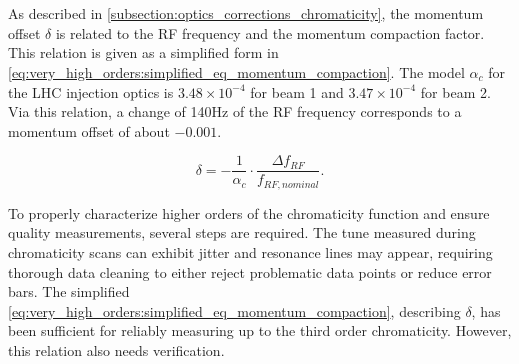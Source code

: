 \section{}


\subsection{}
\label{subsection:decapoles:chromaticity:measurement}

As described in \cref{subsection:optics_corrections_chromaticity}, the momentum offset $\delta$ is
related to the RF frequency and the momentum compaction factor. This relation is given as a
simplified form in \cref{eq:very_high_orders:simplified_eq_momentum_compaction}. 
The model $\alpha_c$ for the LHC injection optics is $3.48 \times 10^{-4}$ for beam 1 and $3.47
\times 10^{-4}$ for beam 2.  Via this relation, a change of 140Hz of the RF frequency corresponds to
a momentum offset of about $-0.001$.

\begin{equation}
    \delta = -\frac{1}{\alpha_c} \cdot \frac{\Delta f_{RF}}{f_{RF,nominal}}.
    \label{eq:very_high_orders:simplified_eq_momentum_compaction}
\end{equation}

%

To properly characterize higher orders of the chromaticity function and ensure quality measurements,
several steps are required. The tune measured during chromaticity scans can exhibit jitter and
resonance lines may appear, requiring thorough data cleaning to either reject problematic data
points or reduce error bars. The simplified
\cref{eq:very_high_orders:simplified_eq_momentum_compaction}, describing $\delta$, has been
sufficient for reliably measuring up to the third order chromaticity. However, this relation also
needs verification.




